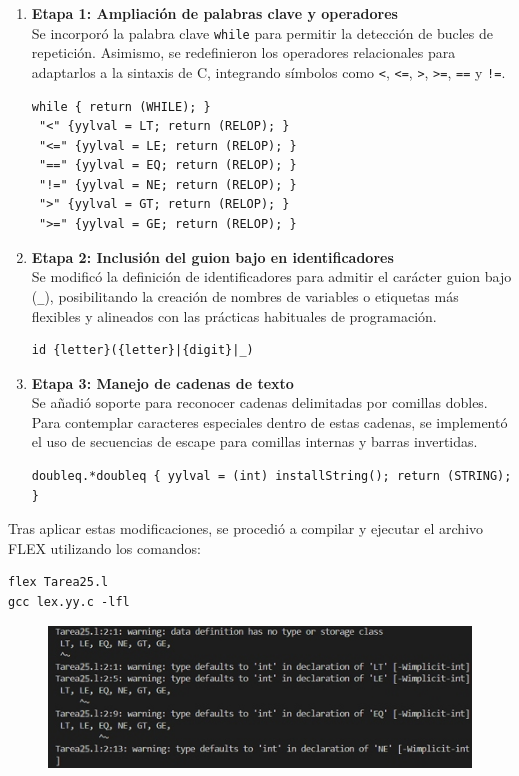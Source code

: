 \documentclass{article}
\begin{document}
\begin{enumerate}
    \item \textbf{Etapa 1: Ampliación de palabras clave y operadores} \\
    Se incorporó la palabra clave \texttt{while} para permitir la detección de bucles de repetición. Asimismo, se redefinieron los operadores relacionales para adaptarlos a la sintaxis de C, integrando símbolos como \texttt{<}, \texttt{<=}, \texttt{>}, \texttt{>=}, \texttt{==} y \texttt{!=}.

\begin{verbatim}
while { return (WHILE); }
 "<" {yylval = LT; return (RELOP); }
 "<=" {yylval = LE; return (RELOP); }
 "==" {yylval = EQ; return (RELOP); }
 "!=" {yylval = NE; return (RELOP); }
 ">" {yylval = GT; return (RELOP); }
 ">=" {yylval = GE; return (RELOP); }        
\end{verbatim}
    
\item \textbf{Etapa 2: Inclusión del guion bajo en identificadores} \\
Se modificó la definición de identificadores para admitir el carácter guion bajo (\texttt{\_}), posibilitando la creación de nombres de variables o etiquetas más flexibles y alineados con las prácticas habituales de programación.

\begin{verbatim}
id {letter}({letter}|{digit}|_)   
\end{verbatim}
    
\item \textbf{Etapa 3: Manejo de cadenas de texto} \\
Se añadió soporte para reconocer cadenas delimitadas por comillas dobles. Para contemplar caracteres especiales dentro de estas cadenas, se implementó el uso de secuencias de escape para comillas internas y barras invertidas.
\begin{verbatim}
doubleq.*doubleq { yylval = (int) installString(); return (STRING); }       
\end{verbatim}
\end{enumerate}

Tras aplicar estas modificaciones, se procedió a compilar y ejecutar el archivo FLEX utilizando los comandos:
\begin{verbatim}
flex Tarea25.l
gcc lex.yy.c -lfl
\end{verbatim}
\begin{figure}[H]
    \centering
    \includegraphics[width=0.7\linewidth]{image.jpg}
\end{figure}
\end{document}

